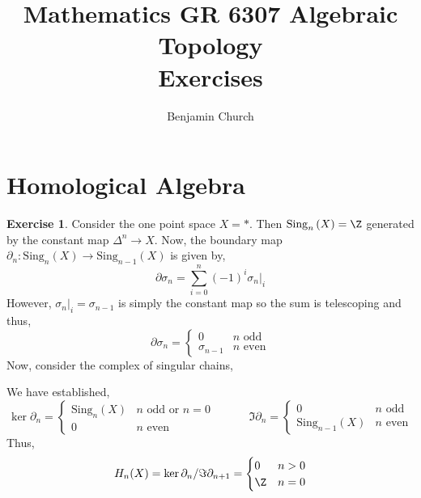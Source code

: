 \documentclass[12pt]{extarticle}
\begin{document}
{\title{%
	\large \textbf{Mathematics GR 6307 Algebraic Topology
	\\ Exercises} \vspace{-2ex}}
\author{Benjamin Church }
\maketitle}

\newcommand{\Sing}[2]{\mathrm{Sing}_{#1}\left( #2 \right)}
\renewcommand{\Hom}[3]{\mathrm{Hom}_{#1}\left( #2, #3 \right)}

\newtheorem{theorem*}{Theorem}
\theoremstyle{definition}
\newtheorem{exercise}[section]{Exercise}


\section{Homological Algebra}

\begin{exercise}
Consider the one point space $X = *$. Then $\Sing{n}{X} = \Z$ generated by the constant map $\Delta^n \to X$. Now, the boundary map $\partial_n : \Sing{n}{X} \to \Sing{n-1}{X}$ is given by,
\[ \partial \sigma_n = \sum_{i = 0}^n (-1)^i \sigma_n |_i \]
However, $\sigma_n |_i = \sigma_{n-1}$ is simply the constant map so the sum is telescoping and thus,
\[ \partial \sigma_n  = \begin{cases}
0 & n \text{ odd}
\\
\sigma_{n-1} & n \text{ even}
\end{cases} \]
Now, consider the complex of singular chains,
\begin{center}
\end{center}
We have established,
\[ \ker{\partial_n} = 
\begin{cases}
\Sing{n}{X} & n \text{ odd or } n = 0
\\
0 & n \text{ even}
\end{cases} \quad \quad \quad \Im{\partial_n} = 
\begin{cases}
0 & n \text{ odd}
\\
\Sing{n-1}{X} & n \text{ even}
\end{cases}  \]
Thus,
\[ H_n(X) = \ker{\partial_n} / \Im{\partial_{n+1}} =
\begin{cases}
0 & n > 0
\\
\Z & n = 0
\end{cases} \]
\end{exercise}
\end{document}
